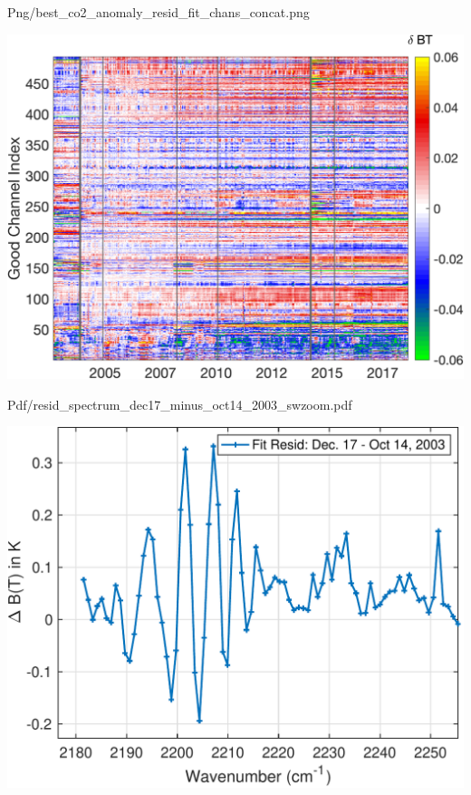 \documentclass[presentation]{beamer}
\begin{document}
\begin{frame}[label={sec:orgd3b624b}]{Png/best\_co2\_anomaly\_resid\_fit\_chans\_concat.png}
\begin{center}
\includegraphics[width=0.7\linewidth]{./Figs/Png/best_co2_anomaly_resid_fit_chans_concat.png}
\end{center}
\end{frame}






\begin{frame}[label={sec:orgb8b84b1}]{Pdf/resid\_spectrum\_dec17\_minus\_oct14\_2003\_swzoom.pdf}
\begin{center}
\includegraphics[width=0.7\linewidth]{./Figs/Pdf/resid_spectrum_dec17_minus_oct14_2003_swzoom.pdf}
\end{center}
\end{frame}
\end{document}
